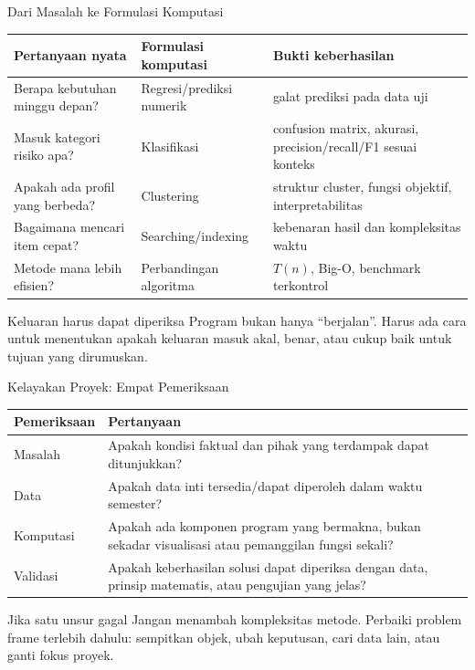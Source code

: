 \documentclass[aspectratio=169,11pt]{beamer}
\begin{document}
\begin{frame}{Dari Masalah ke Formulasi Komputasi}
\small
\begin{center}
\begin{tabular}{p{3.6cm} p{4.5cm} p{4.9cm}}
\toprule
\textbf{Pertanyaan nyata} & \textbf{Formulasi komputasi} & \textbf{Bukti keberhasilan} \\
\midrule
Berapa kebutuhan minggu depan? & Regresi/prediksi numerik & galat prediksi pada data uji \\
Masuk kategori risiko apa? & Klasifikasi & confusion matrix, akurasi, precision/recall/F1 sesuai konteks \\
Apakah ada profil yang berbeda? & Clustering & struktur cluster, fungsi objektif, interpretabilitas \\
Bagaimana mencari item cepat? & Searching/indexing & kebenaran hasil dan kompleksitas waktu \\
Metode mana lebih efisien? & Perbandingan algoritma & $T(n)$, Big-O, benchmark terkontrol \\
\bottomrule
\end{tabular}
\end{center}

\begin{block}{Keluaran harus dapat diperiksa}
\footnotesize
Program bukan hanya ``berjalan''. Harus ada cara untuk menentukan apakah keluaran masuk akal, benar, atau cukup baik untuk tujuan yang dirumuskan.
\end{block}
\end{frame}

\begin{frame}{Kelayakan Proyek: Empat Pemeriksaan}
\small
\begin{center}
\begin{tabular}{p{3.0cm} p{9.8cm}}
\toprule
\textbf{Pemeriksaan} & \textbf{Pertanyaan} \\
\midrule
Masalah & Apakah kondisi faktual dan pihak yang terdampak dapat ditunjukkan? \\
Data & Apakah data inti tersedia/dapat diperoleh dalam waktu semester? \\
Komputasi & Apakah ada komponen program yang bermakna, bukan sekadar visualisasi atau pemanggilan fungsi sekali? \\
Validasi & Apakah keberhasilan solusi dapat diperiksa dengan data, prinsip matematis, atau pengujian yang jelas? \\
\bottomrule
\end{tabular}
\end{center}

\begin{alertblock}{Jika satu unsur gagal}
\footnotesize
Jangan menambah kompleksitas metode. Perbaiki problem frame terlebih dahulu: sempitkan objek, ubah keputusan, cari data lain, atau ganti fokus proyek.
\end{alertblock}
\end{frame}
\end{document}
